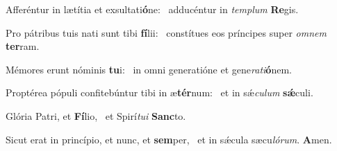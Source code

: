\item Afferéntur in lætítia et exsultati\textbf{ó}ne:~\psstar{} adducéntur in \textit{templum} \textbf{Re}gis.
\item Pro pátribus tuis nati sunt tibi \textbf{fí}lii:~\psstar{} constítues eos príncipes super \textit{omnem} \textbf{ter}ram.
\item Mémores erunt nóminis \textbf{tu}i:~\psstar{} in omni generatióne et gene\textit{rati}\textbf{ó}nem.
\item Proptérea pópuli confitebúntur tibi in æ\textbf{tér}num:~\psstar{} et in sǽ\textit{culum} \textbf{sǽ}culi.
\item Glória Patri, et \textbf{Fí}lio,~\psstar{} et Spirí\textit{tui} \textbf{Sanc}to.
\item Sicut erat in princípio, et nunc, et \textbf{sem}per,~\psstar{} et in sǽcula sæcu\textit{lórum}. \textbf{A}men.
